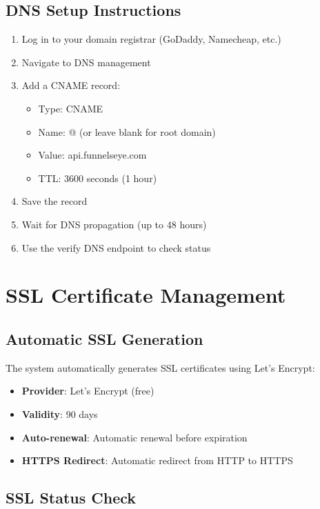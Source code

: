 \documentclass[12pt,a4paper]{article}
\begin{document}
\subsection{DNS Setup Instructions}

\begin{enumerate}
    \item Log in to your domain registrar (GoDaddy, Namecheap, etc.)
    \item Navigate to DNS management
    \item Add a CNAME record:
        \begin{itemize}
            \item Type: CNAME
            \item Name: @ (or leave blank for root domain)
            \item Value: api.funnelseye.com
            \item TTL: 3600 seconds (1 hour)
        \end{itemize}
    \item Save the record
    \item Wait for DNS propagation (up to 48 hours)
    \item Use the verify DNS endpoint to check status
\end{enumerate}

\section{SSL Certificate Management}

\subsection{Automatic SSL Generation}

The system automatically generates SSL certificates using Let's Encrypt:

\begin{itemize}
    \item \textbf{Provider}: Let's Encrypt (free)
    \item \textbf{Validity}: 90 days
    \item \textbf{Auto-renewal}: Automatic renewal before expiration
    \item \textbf{HTTPS Redirect}: Automatic redirect from HTTP to HTTPS
\end{itemize}

\subsection{SSL Status Check}
\end{document}
